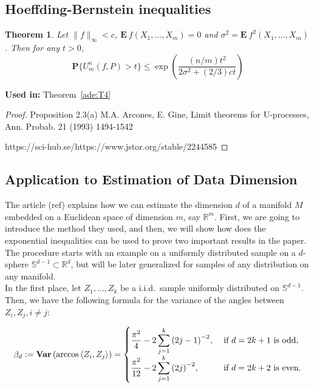 \documentclass[12pt]{exam}
\def\R{\ensuremath{\mathbb{R}}}
\def\S{\ensuremath{\mathbb{S}}}
\def\E{\ensuremath{\mathbf{E}}\:}
\def\P{\ensuremath{\mathbf{P}}}
\def\Var{\ensuremath{\mathbf{Var}}\,}
\newtheorem{theorem}{Theorem}[section]
\theoremstyle{remark}
\newcommand{\angles}[1]{\ensuremath{\left\langle}#1\ensuremath{\right\rangle} }
\begin{document}
\subsection{Hoeffding-Bernstein inequalities}

\begin{theorem}\label{hb:T1}
  Let $\|f\|_\infty < c$, $\E f(X_1,\ldots, X_m) = 0$ and $\sigma^2 = \E f^2(X_1,\ldots, X_m)$. Then for any $t > 0$,
  \begin{equation}
    \P\{U_m^n(f,P) > t\} \leq \exp \left(\frac{(n/m)t^2}{2\sigma^2 + (2/3)ct}\right)
  \end{equation}
\end{theorem}

\textbf{Used in:} Theorem~\ref*{ade:T4}

\begin{proof}
  Proposition 2.3(a) M.A. Arcones, E. Gine, Limit theorems for U-processes, Ann. Probab. 21 (1993) 1494-1542 
  
  https://sci-hub.se/https://www.jstor.org/stable/2244585
\end{proof}


\subsection{Application to Estimation of Data Dimension}
The article (ref) explains how we can estimate the dimension $d$ of a manifold $M$ embedded on a Euclidean space of dimension $m$, say $\R^m$. First, we are going to introduce the method they used, and then, we will show how does the exponential inequalities can be used to prove two important results in the paper. The procedure starts with an example on a uniformly distributed sample on a $d$-sphere $\S^{d-1} \subset \R^d$, but will be later generalized for samples of any distribution on any manifold.\\[4mm]

In the first place, let $Z_1, \ldots, Z_k$ be a i.i.d.\ sample uniformly distributed on $\S^{d-1}$. Then, we have the following formula for the variance of the angles between $Z_i,Z_j, i\neq j$:

\begin{equation}\label{ade:1}\everymath{\displaystyle}
  \beta_d := \Var(\arccos \angles{Z_i,Z_j}) = \begin{cases}
    \frac{\pi^2}{4} - 2 \sum_{j = 1}^{k} {(2j-1)}^{-2}, & \mbox{ if } d = 2k+1 \mbox{ is odd},\\
    \frac{\pi^2}{12}- 2 \sum_{j = 1}^{k} {(2j)}^{-2}, & \mbox{ if } d = 2k+2 \mbox{ is even.}
  \end{cases}
\end{equation}
\end{document}
